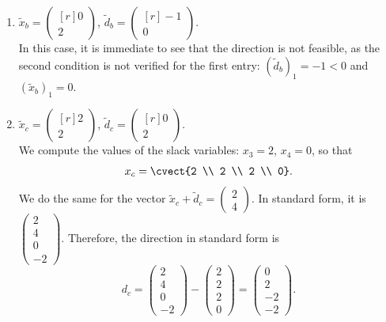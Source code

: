 \begin{enumerate}
%
%
        \item $\tilde{x}_b = \begin{pmatrix*}[r] 0 \\ 2 \end{pmatrix*}$, $\tilde{d}_b = \begin{pmatrix*}[r] -1 \\ 0 \end{pmatrix*}.$ \\
        In this case, it is immediate to see that the direction is not
        feasible, as the second condition is not verified for the
        first entry: $(\tilde{d}_b)_1 = -1 < 0$ and $(\tilde{x}_b)_1 = 0$.
%
%
        \item $\tilde{x}_c = \begin{pmatrix*}[r] 2 \\ 2 \end{pmatrix*}$, $\tilde{d}_c = \begin{pmatrix*}[r] 0 \\ 2 \end{pmatrix*}.$ \\
        We compute the values of the slack variables: $x_3 = 2$, $x_4
        = 0$, so that
        \[
   {x}_c= \cvect{2 \\ 2 \\ 2 \\ 0}.
   \]
   We do the same for the vector $\tilde{x}_c+\tilde{d}_c = \left(\begin{array}{r} 2\\ 4 \end{array}\right)$.
   In standard form, it is $\left(\begin{array}{r} 2\\ 4 \\ 0 \\ -2 \end{array}\right)$.
   Therefore, the direction in standard form is
   \[ d_c = \left(\begin{array}{r} 2\\ 4 \\ 0 \\ -2 \end{array}\right)-
   \left(\begin{array}{r} 2 \\ 2 \\ 2 \\ 0\end{array}\right) =
   \left(\begin{array}{r} 0\\ 2 \\ -2 \\ -2 \end{array}\right).
   \]


\end{enumerate}
